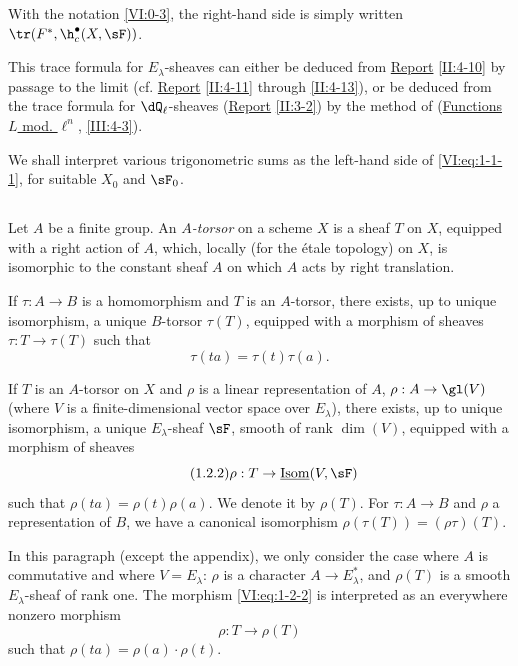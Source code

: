 With the notation \ref{VI:0-3}, the right-hand side is simply written 
$\tr(F^\ast,\h_c^\bullet(X,\sF))$. 

This trace formula for $E_\lambda$-sheaves can either be 
deduced from \hyperref[II]{Report} \ref{II:4-10} by passage to the limit (cf. 
\hyperref[II]{Report} \ref{II:4-11} through \ref{II:4-13}), or be deduced 
from the trace formula for $\dQ_\ell$-sheaves (\hyperref[II]{Report} 
\ref{II:3-2}) by the method of (\hyperref[III]{Functions $L$ mod. $\ell^n$}, 
\ref{III:4-3}). 

We shall interpret various trigonometric sums as the left-hand side of 
\eqref{VI:eq:1-1-1}, for suitable $X_0$ and $\sF_0$. 






\subsection{}\label{VI:1-2}

Let $A$ be a finite group. An \emph{$A$-torsor} on a scheme $X$ is a 
sheaf $T$ on $X$, equipped with a right action of $A$, which, locally 
(for the étale topology) on $X$, is isomorphic to the constant sheaf $A$ on 
which $A$ acts by right translation. 

If $\tau:A\to B$ is a homomorphism and $T$ is an $A$-torsor, there exists, 
up to unique isomorphism, a unique $B$-torsor $\tau(T)$, equipped with a 
morphism of sheaves $\tau:T\to \tau(T)$ such that 
\begin{equation*}\tag{1.2.1}\label{VI:eq:1-2-1}
  \tau(t a) = \tau(t) \tau(a)\text{.}
\end{equation*}

If $T$ is an $A$-torsor on $X$ and $\rho$ is a linear representation 
of $A$, $\rho:A\to \gl(V)$ (where $V$ is a finite-dimensional vector space over 
$E_\lambda$), there exists, up to unique isomorphism, a unique 
$E_\lambda$-sheaf $\sF$, smooth of rank $\dim(V)$, equipped with a morphism of 
sheaves 
\begin{equation*}\tag{1.2.2}\label{VI:eq:1-2-2}
  \rho:T\to \underline{\operatorname{Isom}}(V,\sF)
\end{equation*}
such that $\rho(t a) = \rho(t) \rho(a)$. We denote it by $\rho(T)$. For 
$\tau:A\to B$ and $\rho$ a representation of $B$, we have a canonical 
isomorphism $\rho(\tau(T)) = (\rho\tau)(T)$. 

In this paragraph (except the appendix), we only consider the case where $A$ 
is commutative and where $V=E_\lambda$: $\rho$ is a character 
$A\to E_\lambda^\ast$, and $\rho(T)$ is a smooth $E_\lambda$-sheaf of rank 
one. The morphism \eqref{VI:eq:1-2-2} is interpreted as an everywhere 
nonzero morphism 
\begin{equation*}\tag{1.2.3}\label{VI:eq:1-2-3}
  \rho:T\to \rho(T) 
\end{equation*}
such that $\rho(t a) = \rho(a)\cdot\rho(t)$. 





